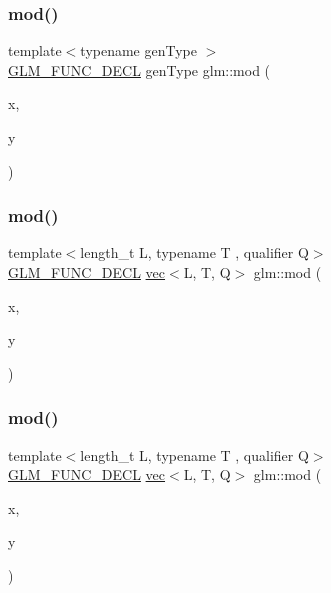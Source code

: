 \subsubsection{\texorpdfstring{mod()}{mod()}\hspace{0.1cm}{\footnotesize\ttfamily [1/3]}}
{\footnotesize\ttfamily template$<$typename gen\+Type $>$ \\
\hyperlink{setup_8hpp_ab2d052de21a70539923e9bcbf6e83a51}{G\+L\+M\+\_\+\+F\+U\+N\+C\+\_\+\+D\+E\+CL} gen\+Type glm\+::mod (\begin{DoxyParamCaption}\item[{gen\+Type}]{x,  }\item[{gen\+Type}]{y }\end{DoxyParamCaption})}

\mbox{\label{group__core__func__common_gafddfd397d57f94556b9560594172a439}} 
\subsubsection{\texorpdfstring{mod()}{mod()}\hspace{0.1cm}{\footnotesize\ttfamily [2/3]}}
{\footnotesize\ttfamily template$<$length\+\_\+t L, typename T , qualifier Q$>$ \\
\hyperlink{setup_8hpp_ab2d052de21a70539923e9bcbf6e83a51}{G\+L\+M\+\_\+\+F\+U\+N\+C\+\_\+\+D\+E\+CL} \hyperlink{structglm_1_1vec}{vec}$<$L, T, Q$>$ glm\+::mod (\begin{DoxyParamCaption}\item[{\hyperlink{structglm_1_1vec}{vec}$<$ L, T, Q $>$ const \&}]{x,  }\item[{T}]{y }\end{DoxyParamCaption})}

\mbox{\label{group__core__func__common_ga9b197a452cd52db3c5c18bac72bd7798}} 
\subsubsection{\texorpdfstring{mod()}{mod()}\hspace{0.1cm}{\footnotesize\ttfamily [3/3]}}
{\footnotesize\ttfamily template$<$length\+\_\+t L, typename T , qualifier Q$>$ \\
\hyperlink{setup_8hpp_ab2d052de21a70539923e9bcbf6e83a51}{G\+L\+M\+\_\+\+F\+U\+N\+C\+\_\+\+D\+E\+CL} \hyperlink{structglm_1_1vec}{vec}$<$L, T, Q$>$ glm\+::mod (\begin{DoxyParamCaption}\item[{\hyperlink{structglm_1_1vec}{vec}$<$ L, T, Q $>$ const \&}]{x,  }\item[{\hyperlink{structglm_1_1vec}{vec}$<$ L, T, Q $>$ const \&}]{y }\end{DoxyParamCaption})}

